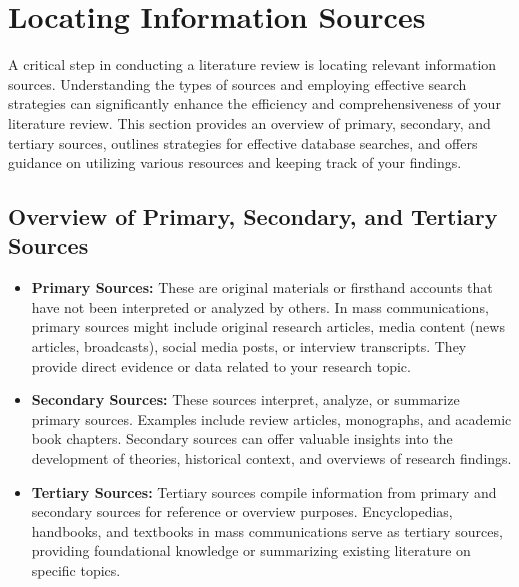 \documentclass[
]{book}
\begin{document}
\hypertarget{locating-information-sources}{%
\section{Locating Information Sources}\label{locating-information-sources}}

A critical step in conducting a literature review is locating relevant information sources. Understanding the types of sources and employing effective search strategies can significantly enhance the efficiency and comprehensiveness of your literature review. This section provides an overview of primary, secondary, and tertiary sources, outlines strategies for effective database searches, and offers guidance on utilizing various resources and keeping track of your findings.

\hypertarget{overview-of-primary-secondary-and-tertiary-sources}{%
\subsection*{Overview of Primary, Secondary, and Tertiary Sources}\label{overview-of-primary-secondary-and-tertiary-sources}}

\begin{itemize}
\item
  \textbf{Primary Sources:} These are original materials or firsthand accounts that have not been interpreted or analyzed by others. In mass communications, primary sources might include original research articles, media content (news articles, broadcasts), social media posts, or interview transcripts. They provide direct evidence or data related to your research topic.
\item
  \textbf{Secondary Sources:} These sources interpret, analyze, or summarize primary sources. Examples include review articles, monographs, and academic book chapters. Secondary sources can offer valuable insights into the development of theories, historical context, and overviews of research findings.
\item
  \textbf{Tertiary Sources:} Tertiary sources compile information from primary and secondary sources for reference or overview purposes. Encyclopedias, handbooks, and textbooks in mass communications serve as tertiary sources, providing foundational knowledge or summarizing existing literature on specific topics.
\end{itemize}
\end{document}
